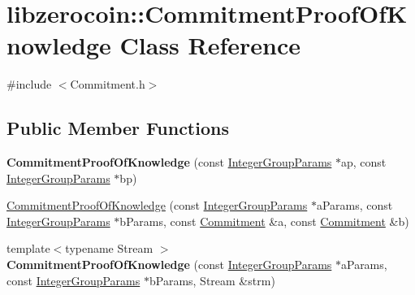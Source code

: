 \hypertarget{classlibzerocoin_1_1_commitment_proof_of_knowledge}{}\section{libzerocoin\+::Commitment\+Proof\+Of\+Knowledge Class Reference}
\label{classlibzerocoin_1_1_commitment_proof_of_knowledge}


{\ttfamily \#include $<$Commitment.\+h$>$}

\subsection*{Public Member Functions}
\begin{DoxyCompactItemize}
\item 
\mbox{\label{classlibzerocoin_1_1_commitment_proof_of_knowledge_abd9cc734a10562911a8cb644b132faf0}} 
{\bfseries Commitment\+Proof\+Of\+Knowledge} (const \mbox{\hyperlink{classlibzerocoin_1_1_integer_group_params}{Integer\+Group\+Params}} $\ast$ap, const \mbox{\hyperlink{classlibzerocoin_1_1_integer_group_params}{Integer\+Group\+Params}} $\ast$bp)
\item 
\mbox{\hyperlink{classlibzerocoin_1_1_commitment_proof_of_knowledge_af66449f2c4c0cb88d19cb409b67b4cff}{Commitment\+Proof\+Of\+Knowledge}} (const \mbox{\hyperlink{classlibzerocoin_1_1_integer_group_params}{Integer\+Group\+Params}} $\ast$a\+Params, const \mbox{\hyperlink{classlibzerocoin_1_1_integer_group_params}{Integer\+Group\+Params}} $\ast$b\+Params, const \mbox{\hyperlink{classlibzerocoin_1_1_commitment}{Commitment}} \&a, const \mbox{\hyperlink{classlibzerocoin_1_1_commitment}{Commitment}} \&b)
\item 
\mbox{\label{classlibzerocoin_1_1_commitment_proof_of_knowledge_a66ce19383e17227c631bd47ebc7e93a0}} 
{\footnotesize template$<$typename Stream $>$ }\\{\bfseries Commitment\+Proof\+Of\+Knowledge} (const \mbox{\hyperlink{classlibzerocoin_1_1_integer_group_params}{Integer\+Group\+Params}} $\ast$a\+Params, const \mbox{\hyperlink{classlibzerocoin_1_1_integer_group_params}{Integer\+Group\+Params}} $\ast$b\+Params, Stream \&strm)
\item 
\mbox{\label{classlibzerocoin_1_1_commitment_proof_of_knowledge_a267631e6e1829578b8ea6073c21c8d96}} 

\end{DoxyCompactItemize}
